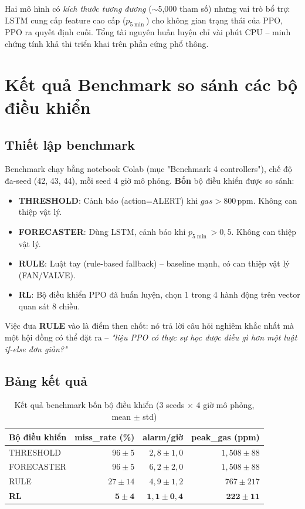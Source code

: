 Hai mô hình có \emph{kích thước tương đương} ($\sim$5{,}000 tham số) nhưng vai trò bổ trợ: LSTM cung cấp feature cao cấp ($p_{5\min}$) cho không gian trạng thái của PPO, PPO ra quyết định cuối. Tổng tài nguyên huấn luyện chỉ vài phút CPU -- minh chứng tính khả thi triển khai trên phần cứng phổ thông.

\section{Kết quả Benchmark so sánh các bộ điều khiển}
\label{ssec:benchmark}

\subsection{Thiết lập benchmark}

Benchmark chạy bằng notebook Colab (mục "Benchmark 4 controllers"), chế độ đa-seed (42, 43, 44), mỗi seed 4 giờ mô phỏng. \textbf{Bốn} bộ điều khiển được so sánh:
\begin{itemize}
  \item \textbf{THRESHOLD}: Cảnh báo (action=ALERT) khi $gas > 800$\,ppm. Không can thiệp vật lý.
  \item \textbf{FORECASTER}: Dùng LSTM, cảnh báo khi $p_{5\min} > 0{,}5$. Không can thiệp vật lý.
  \item \textbf{RULE}: Luật tay (rule-based fallback) -- baseline mạnh, có can thiệp vật lý (FAN/VALVE).
  \item \textbf{RL}: Bộ điều khiển PPO đã huấn luyện, chọn 1 trong 4 hành động trên vector quan sát 8 chiều.
\end{itemize}

Việc đưa \textbf{RULE} vào là điểm then chốt: nó trả lời câu hỏi nghiêm khắc nhất mà một hội đồng có thể đặt ra -- \emph{"liệu PPO có thực sự học được điều gì hơn một luật if-else đơn giản?"}

\subsection{Bảng kết quả}

\begin{table}[H]
\centering
\caption{Kết quả benchmark bốn bộ điều khiển (3 seeds $\times$ 4 giờ mô phỏng, mean $\pm$ std)}
\label{tab:benchmark_results}
\begin{tabular}{lrrr}
\toprule
\textbf{Bộ điều khiển} & \textbf{miss\_rate (\%)} & \textbf{alarm/giờ} & \textbf{peak\_gas (ppm)} \\
\midrule
THRESHOLD   & $96 \pm 5$   & $2{,}8 \pm 1{,}0$ & $1{,}508 \pm 88$ \\
FORECASTER  & $96 \pm 5$   & $6{,}2 \pm 2{,}0$ & $1{,}508 \pm 88$ \\
RULE        & $27 \pm 14$  & $4{,}9 \pm 1{,}2$ & $767 \pm 217$ \\
\textbf{RL} & $\mathbf{5 \pm 4}$ & $\mathbf{1{,}1 \pm 0{,}4}$ & $\mathbf{222 \pm 11}$ \\
\bottomrule
\end{tabular}
\end{table}

